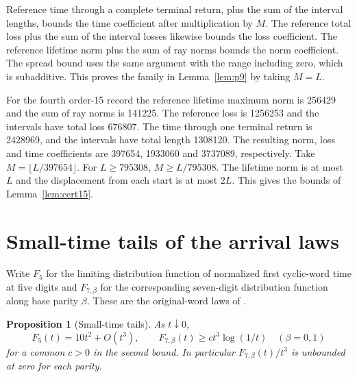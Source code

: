 \documentclass[11pt]{amsart}
\newtheorem{proposition}[theorem]{Proposition}
\theoremstyle{definition}
\begin{document}
Reference time through a complete terminal return,
plus the sum of the interval lengths, bounds the
time coefficient after multiplication by \(M\).
The reference total loss plus the sum of the interval
losses likewise bounds the loss coefficient. The
reference lifetime norm plus the sum of ray norms bounds
the norm coefficient. The spread bound uses the same
argument with the range including zero, which is
subadditive. This proves the family in Lemma~\ref{lem:p9}
by taking \(M=L\).

For the fourth order-15 record the reference lifetime
maximum norm is 256429 and the sum of ray norms is
141225. The reference loss is 1256253 and the intervals
have total loss 676807. The time through one terminal
return is 2428969, and the intervals have total length
1308120. The resulting norm, loss and time coefficients
are 397654, 1933060 and 3737089, respectively. Take
\(M=\lfloor L/397654\rfloor\). For \(L\ge795308\),
\(M\ge L/795308\). The lifetime norm is at most \(L\)
and the displacement from each start is at most \(2L\).
This gives the bounds of Lemma~\ref{lem:cert15}.

\section{Small-time tails of the arrival laws}\label{app:tails}

Write \(F_5\) for the limiting distribution function of
normalized first cyclic-word time at five digits and
\(F_{7,\beta}\) for the corresponding seven-digit
distribution function along base parity \(\beta\).
These are the original-word laws of \cite{G3,G5}.

\begin{proposition}[Small-time tails]\label{prop:tails}
As \(t\downarrow0\),
\[
 F_5(t)=10t^2+O(t^3),\qquad
 F_{7,\beta}(t)\ge c t^3\log(1/t)\quad(\beta=0,1)
\]
for a common \(c>0\) in the second bound. In particular
\(F_{7,\beta}(t)/t^3\) is unbounded at zero for each parity.
\end{proposition}
\end{document}
